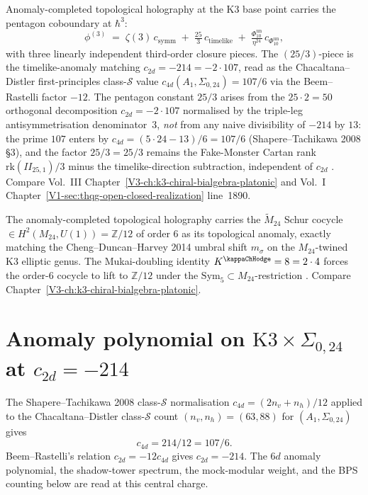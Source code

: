 \begin{remark}
\label{rem:acth-1}
Anomaly-completed topological holography at the K3 base
point carries the pentagon coboundary at $\hbar^3$:
\[
 \phi^{(3)}
 \;=\;
 \zeta(3)\, c_{\mathrm{symm}}
 \;+\;
 \tfrac{25}{3}\, c_{\mathrm{timelike}}
 \;+\;
 \tfrac{\Phi_{10}^{\mathrm{un}}}{\eta^{24}}\, c_{\Phi_{10}^{\mathrm{un}}},
\]
with three linearly independent third-order closure pieces. The
$(25/3)$-piece is the timelike-anomaly matching $c_{2d} = -214 = -2\cdot 107$,
read as the Chacaltana--Distler first-principles class-$\mathcal S$
value $c_{4d}(A_1, \Sigma_{0,24}) = 107/6$ via the Beem--Rastelli
factor $-12$. The pentagon constant $25/3$ arises from the $25\cdot 2
= 50$ orthogonal decomposition $c_{2d} = -2\cdot 107$ normalised by the
triple-leg antisymmetrisation denominator~$3$, \emph{not} from any
naive divisibility of $-214$ by $13$: the prime $107$ enters by
$c_{4d} = (5\cdot 24 - 13)/6 = 107/6$ (Shapere--Tachikawa 2008 \S 3),
and the factor $25/3 = 25/3$ remains the Fake-Monster Cartan rank
$\mathrm{rk}(II_{25,1})/3$ minus the timelike-direction subtraction,
independent of $c_{2d}$
\cite{Drinfeld1990,Borcherds1992,GritsenkoNikulin1998}. Compare
Vol.~III Chapter~\ref{V3-ch:k3-chiral-bialgebra-platonic} and
Vol.~I Chapter~\ref{V1-sec:thqg-open-closed-realization} line~1890.
\end{remark}

\begin{remark}
\label{rem:acth-2}
The anomaly-completed topological holography carries the $\widetilde M_{24}$
Schur cocycle $\in H^2(M_{24}, U(1)) = \mathbb Z/12$ of order $6$ as its
topological anomaly, exactly matching the Cheng--Duncan--Harvey 2014
umbral shift $m_\sigma$ on the $M_{24}$-twined K3 elliptic genus. The
Mukai-doubling identity $K^{\kappaChHodge} = 8 = 2\cdot 4$
forces the order-$6$ cocycle to lift to $\mathbb Z/12$ under the
$\mathrm{Sym}_5\subset M_{24}$-restriction \cite{ChengDuncanHarvey2014,EguchiOoguriTachikawa2010}.
Compare Chapter~\ref{V3-ch:k3-chiral-bialgebra-platonic}.
\end{remark}

\section{Anomaly polynomial on $\mathrm K3\times\Sigma_{0,24}$ at $c_{2d} = -214$}
\label{sec:acth-supplement-ii}

\begin{remark}
\label{rem:anomtop-class-s-central-charge-k3}
The Shapere--Tachikawa 2008 class-$\mathcal S$ normalisation
$c_{4d} = (2n_v + n_h)/12$ applied to the Chacaltana--Distler
class-$\mathcal S$ count $(n_v, n_h) = (63, 88)$ for
$(A_1, \Sigma_{0,24})$ gives
\[
c_{4d}=214/12=107/6.
\]
Beem--Rastelli's relation $c_{2d}=-12c_{4d}$ gives
$c_{2d}=-214$. The $6d$ anomaly polynomial, the shadow-tower
spectrum, the mock-modular weight, and the BPS counting below are
read at this central charge.
\end{remark}

